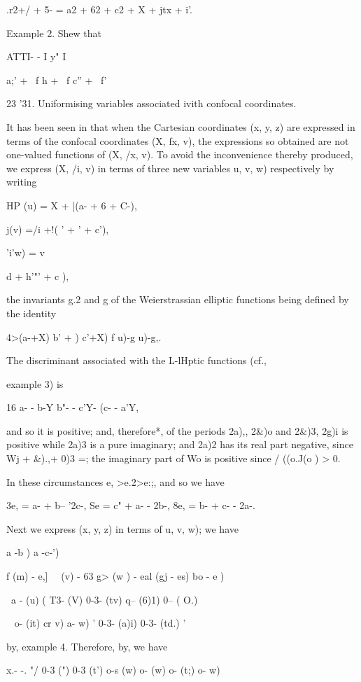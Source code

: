 {{.r2+/ + 5- = a2 + 62 + c2 + X + jtx + i'.

Example 2. Shew that

ATTI- - I y" I

   a;' + \ f h + \ f c'' + \ f'

23 '31. Uniformising variables associated ivith confocal coordinates.

It has been seen in that when the Cartesian coordinates (x, y,
z) are expressed in terms of the confocal coordinates (X, fx, v), the
expressions so obtained are not one-valued functions of (X, /x, v). To
avoid the inconvenience thereby produced, we express (X, /i, v) in
terms of three new variables u, v, w) respectively by writing

HP (u) = X + |(a- + 6 + C-),

 j(v) =/i +!( ' + ' + c'),

'i'w) = v \ \ {d + h'"' + c ),

the invariants g.2 and g of the Weierstrassian elliptic functions
being defined by the identity

4>(a-+X) b' + ) c'+X) f u)-g u)-g,.

%
%

The discriminant associated with the L-lHptic functions (cf.,

example 3) is

16 a- - b-Y b"- - c'Y- (c- - a'Y,

and so it is positive; and, therefore*, of the periods 2a),, 2\&)o
and 2\&)3, 2g)i is positive while 2a)3 is a pure imaginary; and 2a)2
has its real part negative, since Wj + \&).,+ 0)3 =; the imaginary
part of Wo is positive since / ((o.J(o ) > 0.

In these circumstances e, >e.2>e:;, and so we have

3e, = a- + b-- '2c-, Se = c" + a- - 2b-, 8e, = b- + c- - 2a-.

Next we express (x, y, z) in terms of u, v, w); we have

 a -b ) a -c-')

   f (m) - e,] \ \ (v) - 63 g> (w ) - eal (gj - es) bo - e )

\ a - (u) ( T3- (V) 0-3- (tv) q-- (6)1) 0-- ( O.)

~ o- (it) cr v) a- w) ' 0-3- (a)i) 0-3- (td.) '

by, example 4. Therefore, by, we have

x.- -. "/ 0-3 (") 0-3 (t') o-s (w) o- (w) o- (t;) o- w)

}}}
